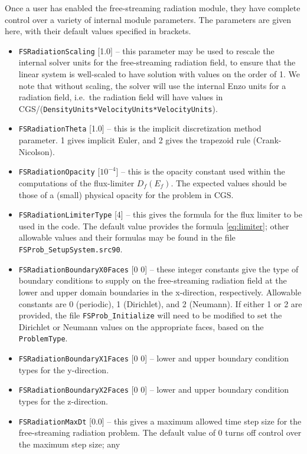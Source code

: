 \documentclass[letterpaper,10pt]{article}
\renewcommand{\(}{\left(}
\renewcommand{\)}{\right)}
\newcommand{\Ef}{E_f}
\begin{document}
Once a user has enabled the free-streaming radiation module, they have
complete control over a variety of internal module parameters.  The
parameters are given here, with their default values specified in brackets.
\begin{itemize}
\item {\tt FSRadiationScaling} [1.0] -- this parameter may be used to
  rescale the internal solver units for the free-streaming radiation
  field, to ensure that the linear system is well-scaled to have
  solution with values on the order of 1.  We note that without
  scaling, the solver will use the internal Enzo units for a radiation
  field, i.e.~the radiation field will have values in 
  CGS/({\tt DensityUnits*VelocityUnits*VelocityUnits}). 
\item {\tt FSRadiationTheta} [1.0] -- this is the implicit
  discretization method parameter.  1 gives implicit Euler, and 2
  gives the trapezoid rule (Crank-Nicolson).
\item {\tt FSRadiationOpacity} [$10^{-4}$] -- this is the opacity
  constant used within the computations of the flux-limiter
  $D_f(\Ef)$.  The expected values should be those of a (small)
  physical opacity for the problem in CGS.
\item {\tt FSRadiationLimiterType} [4] -- this gives the formula for
  the flux limiter to be used in the code.  The default value provides
  the formula \eqref{eq:limiter}; other allowable values and their
  formulas may be found in the file {\tt FSProb\_SetupSystem.src90}.
\item {\tt FSRadiationBoundaryX0Faces} [0 0] -- these integer
  constants give the type of boundary conditions to supply on the
  free-streaming radiation field at the lower and upper domain
  boundaries in the x-direction, respectively.  Allowable 
  constants are 0 (periodic), 1 (Dirichlet), and 2 (Neumann).  If
  either 1 or 2 are provided, the file {\tt FSProb\_Initialize} will
  need to be modified to set the Dirichlet or Neumann values on the
  appropriate faces, based on the {\tt ProblemType}.
\item {\tt FSRadiationBoundaryX1Faces} [0 0] -- lower and upper
  boundary condition types for the y-direction.
\item {\tt FSRadiationBoundaryX2Faces} [0 0] -- lower and upper
  boundary condition types for the z-direction.
\item {\tt FSRadiationMaxDt} [0.0] -- this gives a maximum allowed
  time step size for the free-streaming radiation problem.  The
  default value of 0 turns off control over the maximum step size; any

\end{itemize}
\end{document}
